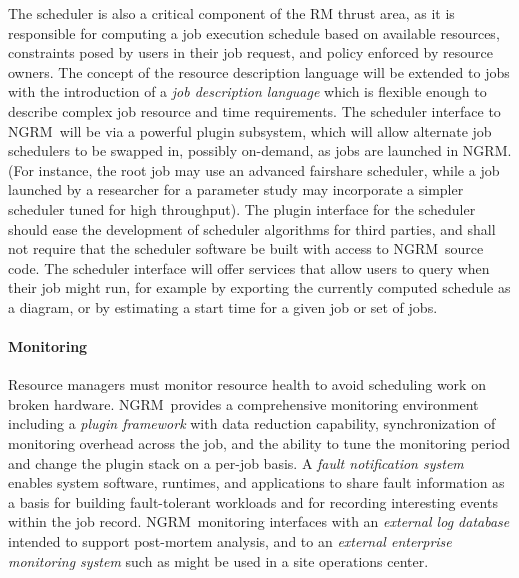 \documentclass[10pt]{article}
\newcommand{\ngrm}{NGRM}
\begin{document}
The scheduler is also a critical component of the RM thrust area,
as it is responsible for computing a job execution schedule based
on available resources, constraints posed by users in their job
request, and policy enforced by resource owners. The concept of
the resource description language will be extended to jobs with the
introduction of a {\em job description language} which is flexible
enough to describe complex job resource and time requirements. The
scheduler interface to \ngrm\ will be via a powerful plugin
subsystem, which will allow alternate job schedulers to be swapped
in, possibly on-demand, as jobs are launched in \ngrm. (For
instance, the root job may use an advanced fairshare scheduler,
while a job launched by a researcher for a parameter study may
incorporate a simpler scheduler tuned for high throughput). The
plugin interface for the scheduler should ease the development of
scheduler algorithms for third parties, and shall not require that
the scheduler software be built with access to \ngrm\ source code.
The scheduler interface will offer services that allow users
to query when their job might run, for example by exporting
the currently computed schedule as a diagram, or by estimating
a start time for a given job or set of jobs.

\paragraph{Monitoring}
Resource managers must monitor resource health to avoid scheduling
work on broken hardware.  \ngrm\ provides a comprehensive monitoring
environment including a {\em plugin framework} with data reduction
capability, synchronization of monitoring overhead across the job,
and the ability to tune the monitoring period and change the plugin
stack on a per-job basis.
A {\em fault notification system} enables system software, runtimes, and
applications to share fault information as a basis for building fault-tolerant
workloads and for recording interesting events within the job record.
\ngrm\ monitoring interfaces with an {\em external log database} intended
to support post-mortem analysis, and to
an {\em external enterprise monitoring system} such as might be used in
a site operations center.
\end{document}
